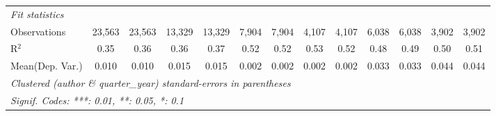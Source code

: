 \begin{tabular}{lcccccccccccc}
   \midrule
   \emph{Fit statistics}\\
   Observations                             & 23,563        & 23,563        & 13,329        & 13,329        & 7,904        & 7,904          & 4,107   & 4,107     & 6,038        & 6,038         & 3,902        & 3,902\\  
   R$^2$                                    & 0.35          & 0.36          & 0.36          & 0.37          & 0.52         & 0.52           & 0.53    & 0.52      & 0.48         & 0.49          & 0.50         & 0.51\\  
Mean(Dep. Var.) & 0.010 & 0.010 & 0.015 & 0.015 & 0.002 & 0.002 & 0.002 & 0.002 & 0.033 & 0.033 & 0.044 & 0.044 \\
   \midrule \midrule
   \multicolumn{13}{l}{\emph{Clustered (author \& quarter\_year) standard-errors in parentheses}}\\
   \multicolumn{13}{l}{\emph{Signif. Codes: ***: 0.01, **: 0.05, *: 0.1}}\\
\end{tabular}
\par\endgroup
